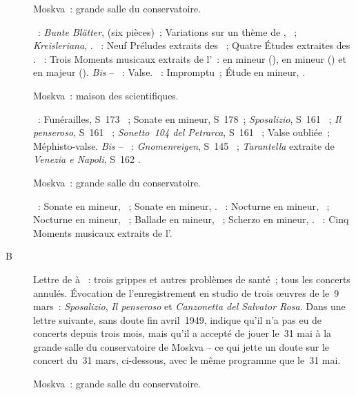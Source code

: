 \begin{description}
 \item[]
 Moskva~: grande salle du conservatoire.

 \textsc{\Schumann{}}~: \emph{Bunte Blätter},  (six pièces)~;
 Variations sur un thème de \CWieck{}, ~;
 \emph{Kreisleriana}, .
 \textsc{\Scriabine{}}~: Neuf Préludes extraits des ~; Quatre Études extraites des .
 \textsc{\Rachmaninov{}}~: Trois Moments musicaux extraits de l'~:
 en \kE \Flat mineur (), en \kE mineur () et en \kC
 majeur ().
 \emph{Bis} -- \textsc{\Rachmaninov{}}~: Valse.
 \textsc{\Scriabine{}}~: Impromptu~; Étude en \kD \Sharp mineur, 
 .
 \item[]
 Moskva~: maison des scientifiques.

 \textsc{\Liszt{}}~: Funérailles, S~173 ~; Sonate en \kB mineur,
 S~178~; \emph{Sposalizio}, S~161 ~; \emph{Il penseroso}, S~161
 ~; \emph{Sonetto~104 del Petrarca}, S~161 ~; Valse
 oubliée~; Méphisto-valse.
 \emph{Bis} -- \textsc{\Liszt{}}~: \emph{Gnomenreigen}, S~145 ~;
 \emph{Tarantella} extraite de \emph{Venezia e Napoli}, S~162 .
 \item[]
 Moskva~: grande salle du conservatoire.

 \textsc{\Beethoven{}}~: Sonate en \kF mineur, ~; Sonate en \kC
 \Sharp mineur,  .
 \textsc{\Chopin{}}~: Nocturne en \kC mineur,  ~;
 Nocturne en \kG mineur,  ~; Ballade en \kG mineur,
 ~; Scherzo en \kB mineur, .
 \textsc{\Rachmaninov{}}~: Cinq Moments musicaux extraits de l'.
 \item[B]
 Lettre de \VSofronitsky{} à \AVizel{} \citep[p.~169]{Nekrasova08}~: trois
 grippes et autres problèmes de santé~; tous les concerts annulés.
 Évocation de l'enregistrement en studio de trois œuvres de \Liszt{} le~9
 mars~: \emph{Sposalizio}, \emph{Il penseroso} et \emph{Canzonetta del
 Salvator Rosa}.
 Dans une lettre suivante, sans doute fin avril~1949, \Sofronitsky{} indique
 qu'il n'a pas eu de concerts depuis trois mois, mais qu'il a accepté de
 jouer le~31 mai à la grande salle du conservatoire de Moskva
 \citep[p.~169-170]{Nekrasova08} -- ce qui jette un doute sur le concert
 du~31 mars, ci-dessous, avec le même programme que le~31 mai.
 \item[]
 Moskva~: grande salle du conservatoire.


\end{description}
